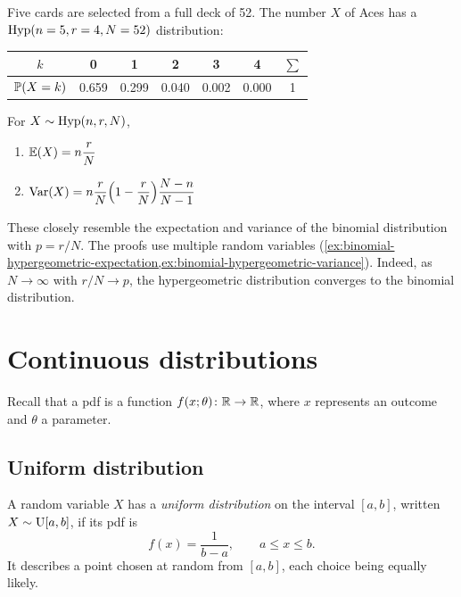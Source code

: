 \begin{example}[Aces]\label{ex:hypergeometric-aces}
Five cards are selected from a full deck of 52. The number $X$ of Aces has a $\mathrm{Hyp}(n = 5, r = 4, N = 52)$ distribution:
\begin{center}
\renewcommand{\arraystretch}{1.25}
\begin{tabular}{c|cccccc}
$k$ & 0 & 1 & 2 & 3 & 4 & $\sum$ \\
\hline
$\mathbb{P}(X = k)$ & 0.659 & 0.299 & 0.040 & 0.002 & 0.000 & 1 \\
\end{tabular}
\end{center}
\end{example}

\begin{theorem}\label{thm:hypergeometric-properties}
For $X \sim \mathrm{Hyp}(n, r, N)$,
\begin{enumerate}
  \item $\operatorname{\mathbb{E}}(X) = n \dfrac{r}{N}$
  \item $\operatorname{Var}(X) = n \dfrac{r}{N} \Bigl(1 - \dfrac{r}{N}\Bigr) \dfrac{N - n}{N - 1}$
\end{enumerate}
\end{theorem}

These closely resemble the expectation and variance of the binomial distribution with $p = r/N$. The proofs use multiple random variables (\cref{ex:binomial-hypergeometric-expectation,ex:binomial-hypergeometric-variance}). Indeed, as $N \to \infty$ with $r/N \to p$, the hypergeometric distribution converges to the binomial distribution.

\section{Continuous distributions}\label{sec:continuous-families}

Recall that a pdf is a function $f(x; \theta) \colon \mathbb{R} \to \mathbb{R}$, where $x$ represents an outcome and $\theta$ a parameter.

\subsection{Uniform distribution}\label{sec:uniform}

\begin{definition}\label{def:uniform}
A random variable $X$ has a \emph{uniform distribution} on the interval $[a, b]$, written $X \sim \mathrm{U}[a, b]$, if its pdf is
\[
  f(x) = \frac{1}{b - a}, \qquad a \le x \le b.
\]
It describes a point chosen at random from $[a, b]$, each choice being equally likely.
\end{definition}

